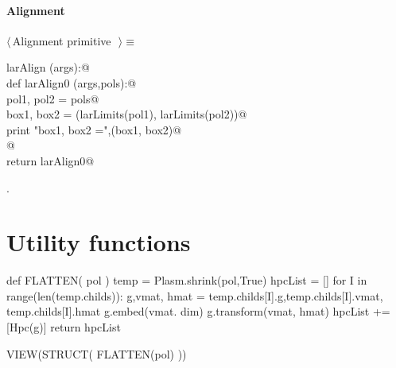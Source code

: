 \documentclass[11pt,oneside]{article}	%
\begin{document}
\paragraph{Alignment}
\begin{flushleft} \small \label{scrap49}
$\langle\,$Alignment primitive\nobreak\ {\footnotesize {}}$\,\rangle\equiv$
\vspace{-1ex}
\begin{list}{}{} \item
\mbox{}\verb@def larAlign (args):@\\
\mbox{}\verb@   def larAlign0 (args,pols):@\\
\mbox{}\verb@      pol1, pol2 = pols@\\
\mbox{}\verb@      box1, box2 = (larLimits(pol1), larLimits(pol2))@\\
\mbox{}\verb@      print "box1, box2 =",(box1, box2)@\\
\mbox{}\verb@      @\\
\mbox{}\verb@   return larAlign0@\\
\mbox{}\verb@@{\NWsep}
\end{list}
\vspace{-1ex}
\footnotesize\addtolength{\baselineskip}{-1ex}
\begin{list}{}{\setlength{\itemsep}{-\parsep}\setlength{\itemindent}{-\leftmargin}}
\item {\NWtxtMacroNoRef}.
\end{list}
\end{flushleft}

\appendix
\section{Utility functions}



def FLATTEN( pol )
	temp = Plasm.shrink(pol,True)
	hpcList = []
	for I in range(len(temp.childs)):			
		g,vmat, hmat = temp.childs[I].g,temp.childs[I].vmat, temp.childs[I].hmat
		g.embed(vmat. dim)
		g.transform(vmat, hmat)
		hpcList += [Hpc(g)]
	return hpcList
	
VIEW(STRUCT( FLATTEN(pol) ))
\end{document}
